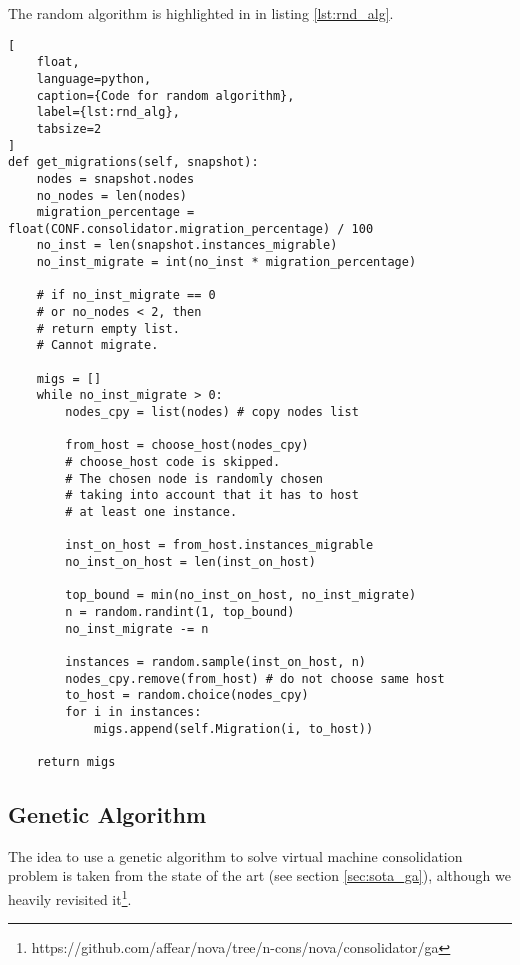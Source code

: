 The random algorithm is highlighted in in listing \ref{lst:rnd_alg}.

\begin{lstlisting}[
	float,
	language=python,
	caption={Code for random algorithm},
	label={lst:rnd_alg},
	tabsize=2
]
def get_migrations(self, snapshot):
	nodes = snapshot.nodes
	no_nodes = len(nodes)
	migration_percentage = float(CONF.consolidator.migration_percentage) / 100
	no_inst = len(snapshot.instances_migrable)
	no_inst_migrate = int(no_inst * migration_percentage)

	# if no_inst_migrate == 0
	# or no_nodes < 2, then
	# return empty list.
	# Cannot migrate.

	migs = []
	while no_inst_migrate > 0:
		nodes_cpy = list(nodes) # copy nodes list

		from_host = choose_host(nodes_cpy)
		# choose_host code is skipped.
		# The chosen node is randomly chosen
		# taking into account that it has to host
		# at least one instance.

		inst_on_host = from_host.instances_migrable
		no_inst_on_host = len(inst_on_host)

		top_bound = min(no_inst_on_host, no_inst_migrate)
		n = random.randint(1, top_bound)
		no_inst_migrate -= n

		instances = random.sample(inst_on_host, n)
		nodes_cpy.remove(from_host) # do not choose same host
		to_host = random.choice(nodes_cpy)
		for i in instances:
			migs.append(self.Migration(i, to_host))

	return migs
\end{lstlisting}

\subsection{Genetic Algorithm}
\label{sub:algs_ga}
The idea to use a genetic algorithm to solve virtual machine consolidation problem is taken from the state of the art (see section \ref{sec:sota_ga}), although we heavily revisited it\footnote{https://github.com/affear/nova/tree/n-cons/nova/consolidator/ga}.

